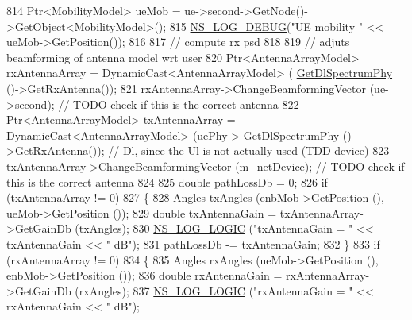 \begin{DoxyCode}
814                 Ptr<MobilityModel> ueMob = ue->second->GetNode()->GetObject<MobilityModel>();
815                 \hyperlink{group__logging_ga413f1886406d49f59a6a0a89b77b4d0a}{NS\_LOG\_DEBUG}(\textcolor{stringliteral}{"UE mobility "} << ueMob->GetPosition());
816                 
817                 \textcolor{comment}{// compute rx psd}
818 
819                 \textcolor{comment}{// adjuts beamforming of antenna model wrt user}
820                 Ptr<AntennaArrayModel> rxAntennaArray = DynamicCast<AntennaArrayModel> (
      \hyperlink{classns3_1_1MmWaveEnbPhy_a1fd12ed3e1da54288cf17a1bb9bcdf74}{GetDlSpectrumPhy} ()->GetRxAntenna());
821                 rxAntennaArray->ChangeBeamformingVector (ue->second);                                                                   \textcolor{comment}{
      // TODO check if this is the correct antenna}
822                 Ptr<AntennaArrayModel> txAntennaArray = DynamicCast<AntennaArrayModel> (uePhy->
      GetDlSpectrumPhy ()->GetRxAntenna());                                                                                                                                                                \textcolor{comment}{
      // Dl, since the Ul is not actually used (TDD device)}
823                 txAntennaArray->ChangeBeamformingVector (\hyperlink{classns3_1_1MmWavePhy_a0f14f4e8f7539b06497ba321d9df344c}{m\_netDevice});                                                                       \textcolor{comment}{
      // TODO check if this is the correct antenna}
824                 
825                 \textcolor{keywordtype}{double} pathLossDb = 0;
826                 \textcolor{keywordflow}{if} (txAntennaArray != 0)
827                 \{
828                   Angles txAngles (enbMob->GetPosition (), ueMob->GetPosition ());
829                   \textcolor{keywordtype}{double} txAntennaGain = txAntennaArray->GetGainDb (txAngles);
830                   \hyperlink{group__logging_ga88acd260151caf2db9c0fc84997f45ce}{NS\_LOG\_LOGIC} (\textcolor{stringliteral}{"txAntennaGain = "} << txAntennaGain << \textcolor{stringliteral}{" dB"});
831                   pathLossDb -= txAntennaGain;
832                 \}
833                 \textcolor{keywordflow}{if} (rxAntennaArray != 0)
834                 \{
835                   Angles rxAngles (ueMob->GetPosition (), enbMob->GetPosition ());
836                   \textcolor{keywordtype}{double} rxAntennaGain = rxAntennaArray->GetGainDb (rxAngles);
837                   \hyperlink{group__logging_ga88acd260151caf2db9c0fc84997f45ce}{NS\_LOG\_LOGIC} (\textcolor{stringliteral}{"rxAntennaGain = "} << rxAntennaGain << \textcolor{stringliteral}{" dB"});

\end{DoxyCode}
